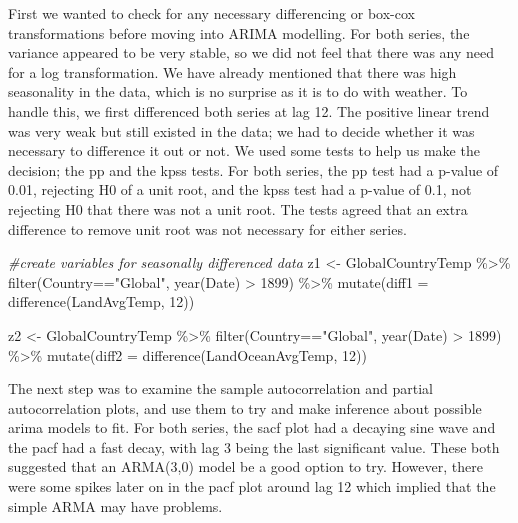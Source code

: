 \documentclass[
]{article}
\newenvironment{Shaded}{\begin{snugshade}}{\end{snugshade}}
\newcommand{\AttributeTok}[1]{\textcolor[rgb]{0.77,0.63,0.00}{#1}}
\newcommand{\CommentTok}[1]{\textcolor[rgb]{0.56,0.35,0.01}{\textit{#1}}}
\newcommand{\DecValTok}[1]{\textcolor[rgb]{0.00,0.00,0.81}{#1}}
\newcommand{\FunctionTok}[1]{\textcolor[rgb]{0.00,0.00,0.00}{#1}}
\newcommand{\NormalTok}[1]{#1}
\newcommand{\OtherTok}[1]{\textcolor[rgb]{0.56,0.35,0.01}{#1}}
\newcommand{\SpecialCharTok}[1]{\textcolor[rgb]{0.00,0.00,0.00}{#1}}
\newcommand{\StringTok}[1]{\textcolor[rgb]{0.31,0.60,0.02}{#1}}
\begin{document}
First we wanted to check for any necessary differencing or box-cox
transformations before moving into ARIMA modelling. For both series, the
variance appeared to be very stable, so we did not feel that there was
any need for a log transformation. We have already mentioned that there
was high seasonality in the data, which is no surprise as it is to do
with weather. To handle this, we first differenced both series at lag
12. The positive linear trend was very weak but still existed in the
data; we had to decide whether it was necessary to difference it out or
not. We used some tests to help us make the decision; the pp and the
kpss tests. For both series, the pp test had a p-value of 0.01,
rejecting H0 of a unit root, and the kpss test had a p-value of 0.1, not
rejecting H0 that there was not a unit root. The tests agreed that an
extra difference to remove unit root was not necessary for either
series.

\begin{Shaded}
\begin{Highlighting}[]
\CommentTok{\#create variables for seasonally differenced data}
\NormalTok{z1 }\OtherTok{\textless{}{-}}\NormalTok{ GlobalCountryTemp }\SpecialCharTok{\%\textgreater{}\%} \FunctionTok{filter}\NormalTok{(Country}\SpecialCharTok{==}\StringTok{"Global"}\NormalTok{,  }\FunctionTok{year}\NormalTok{(Date) }\SpecialCharTok{\textgreater{}} \DecValTok{1899}\NormalTok{) }\SpecialCharTok{\%\textgreater{}\%} \FunctionTok{mutate}\NormalTok{(}\AttributeTok{diff1 =} \FunctionTok{difference}\NormalTok{(LandAvgTemp, }\DecValTok{12}\NormalTok{))}

\NormalTok{z2 }\OtherTok{\textless{}{-}}\NormalTok{ GlobalCountryTemp }\SpecialCharTok{\%\textgreater{}\%}  \FunctionTok{filter}\NormalTok{(Country}\SpecialCharTok{==}\StringTok{"Global"}\NormalTok{,  }\FunctionTok{year}\NormalTok{(Date) }\SpecialCharTok{\textgreater{}} \DecValTok{1899}\NormalTok{) }\SpecialCharTok{\%\textgreater{}\%} \FunctionTok{mutate}\NormalTok{(}\AttributeTok{diff2 =} \FunctionTok{difference}\NormalTok{(LandOceanAvgTemp, }\DecValTok{12}\NormalTok{)) }
\end{Highlighting}
\end{Shaded}

The next step was to examine the sample autocorrelation and partial
autocorrelation plots, and use them to try and make inference about
possible arima models to fit. For both series, the sacf plot had a
decaying sine wave and the pacf had a fast decay, with lag 3 being the
last significant value. These both suggested that an ARMA(3,0) model be
a good option to try. However, there were some spikes later on in the
pacf plot around lag 12 which implied that the simple ARMA may have
problems.
\end{document}
